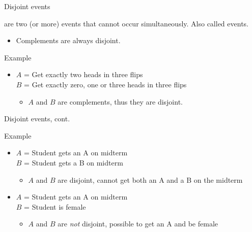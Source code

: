 \documentclass[xcolor=table, aspectratio=169, bigger]{beamer}
\begin{document}
\begin{frame}{Disjoint events}
\begin{block}{}
 are two (or more) events that cannot occur simultaneously. Also called  events.
\begin{itemize}
\pause
\item Complements are always disjoint.
\end{itemize}
\end{block}

\pause
\begin{exampleblock}{Example}
\begin{itemize}
\item $A$ = Get exactly two heads in three flips\\
$B$ = Get exactly zero, one or three heads in three flips\\
\pause
\begin{itemize}
\item $A$ and $B$ are complements, thus they are disjoint.
\end{itemize}

\end{itemize}

\end{exampleblock}
\end{frame}

\begin{frame}{Disjoint events, cont.}
\begin{exampleblock}{Example}
\begin{itemize}
\item $A$ = Student gets an A on midterm\\
$B$ = Student gets a B on midterm\\
\pause
\begin{itemize}
\item $A$ and $B$ are disjoint, cannot get both an A and a B on the midterm
\end{itemize}

\pause
\item $A$ = Student gets an A on midterm\\
$B$ = Student is female\\
\pause
\begin{itemize}
\item $A$ and $B$ are \emph{not} disjoint, possible to get an A and be female
\end{itemize}
\end{itemize}

\end{exampleblock}
\end{frame}
\end{document}

